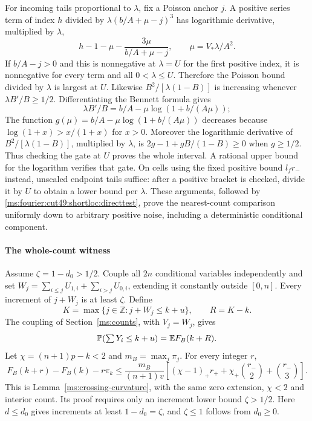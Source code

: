 For incoming tails proportional to $\lambda$, fix a Poisson anchor $j$.
A positive series term of index $h$ divided by
$\lambda(b/A+\mu-j)^3$ has logarithmic derivative, multiplied by $\lambda$,
\[
 h-1-\mu-\frac{3\mu}{b/A+\mu-j},\qquad \mu=V_*\lambda/A^2.
\]
If $b/A-j>0$ and this is nonnegative at $\lambda=U$ for the first positive
index, it is nonnegative for every term and all $0<\lambda\le U$.
Therefore the Poisson bound divided by $\lambda$ is largest at $U$.
Likewise $B^2/[\lambda(1-B)]$ is increasing whenever
$\lambda B'/B\ge1/2$. Differentiating the Bennett formula gives
\[
 \lambda B'/B=b/A-\mu\log(1+b/(A\mu));
\]
The function $g(\mu)=b/A-\mu\log(1+b/(A\mu))$ decreases because
$\log(1+x)>x/(1+x)$ for $x>0$. Moreover the logarithmic derivative of
$B^2/[\lambda(1-B)]$, multiplied by $\lambda$, is
$2g-1+gB/(1-B)\ge0$ when $g\ge1/2$. Thus checking the gate at $U$
proves the whole interval. A rational upper bound for the logarithm
verifies that gate. On cells using the fixed positive bound $l_fr_-$ instead,
unscaled endpoint tails suffice: after a positive bracket is checked, divide
it by $U$ to obtain a lower bound per $\lambda$. These arguments, followed by
\eqref{ms:fourier:cut49:shortloc:directtest}, prove the nearest-count comparison uniformly down to arbitrary positive
noise, including a deterministic conditional component.

\paragraph{The whole-count witness}

Assume $\zeta=1-d_0>1/2$. Couple all $2n$ conditional variables independently and
set $W_j=\sum_{i\le j}U_{1,i}+\sum_{i>j}U_{0,i}$, extending it constantly
outside $[0,n]$. Every increment of $j+W_j$ is at least $\zeta$. Define
\[
 K=\max\{j\in\mathbb Z:j+W_j\le k+u\},\qquad R=K-k.
\]
The coupling of Section~\ref{ms:counts}, with $V_j=W_j$, gives
\begin{equation}\label{ms:fourier:cut49:shortloc:cutoff}
                  \mathbb P(\textstyle\sum Y_i\le k+u)=\mathbb E F_B(k+R).
\end{equation}
Let $\chi=(n+1)p-k<2$ and $m_B=\max_j\pi_j$. For every integer $r$,
\begin{equation}\label{ms:fourier:cut49:shortloc:curvature}
 F_B(k+r)-F_B(k)-r\pi_k\le\frac{m_B}{(n+1)v}
 \left[(\chi-1)_+r_++\chi_+\binom{r_-}{2}+\binom{r_-}{3}\right].
\end{equation}
This is Lemma~\ref{ms:crossing-curvature}, with the same zero extension,
$\chi<2$ and interior count. Its proof requires only an increment lower
bound $\zeta>1/2$. Here $d\le d_0$ gives increments at least $1-d_0=\zeta$,
and $\zeta\le1$ follows from $d_0\ge0$.

